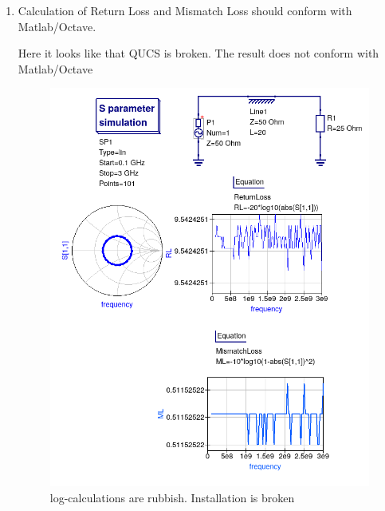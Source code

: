 \documentclass{article}
\begin{document}
\begin{multicols}{2}
\begin{enumerate}[label=(\alph*)]
\item Calculation of Return Loss and Mismatch Loss should conform with Matlab/Octave.

Here it looks like that QUCS is broken. The result does not conform with Matlab/Octave
\begin{figure}[H]
  \includegraphics[width=\linewidth]{tline4.png}
  \caption{log-calculations are rubbish. Installation is broken}
  \label{fig4}
\end{figure}


\end{enumerate}
\end{multicols}
\end{document}
